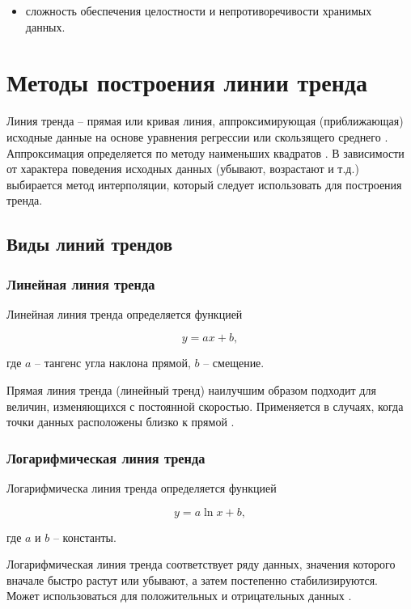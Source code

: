 \documentclass{bmstu}
\begin{document}
\begin{itemize}
	\item сложность обеспечения целостности и непротиворечивости хранимых данных.
\end{itemize}


\section{Методы построения линии тренда}

Линия тренда -- прямая или кривая линия, аппроксимирующая (приближающая) исходные данные на основе уравнения регрессии или скользящего среднего \cite{lt-exel}. Аппроксимация определяется по ме­тоду наименьших квадратов \cite{mnk}. В зависимости от характера поведения исходных данных (убыва­ют, возрастают и т.д.) выбирается метод интерполяции, который сле­дует использовать для построения тренда.

\subsection{Виды линий трендов}

\subsubsection*{Линейная линия тренда}

Линейная линия тренда определяется функцией

\begin{equation}
	y = ax + b,
\end{equation}

где $a$ -- тангенс угла наклона прямой, $b$ -- смещение.

Прямая линия тренда (линейный тренд) наилучшим образом подходит для величин, изменяющихся с постоянной скоростью. Приме­няется в случаях, когда точки данных расположены близко к прямой \cite{lt-exel}.

\subsubsection*{Логарифмическая линия тренда}

Логарифмическа линия тренда определяется функцией

\begin{equation}
	y = a\ln x + b,
\end{equation}

где $a$ и $b$ -- константы.

Логарифмическая линия тренда соответствует ряду данных, значения которого вначале быстро растут или убывают, а затем постепенно стабилизируются. Может использоваться для положительных и отрицательных данных \cite{lt-exel}.
\end{document}
